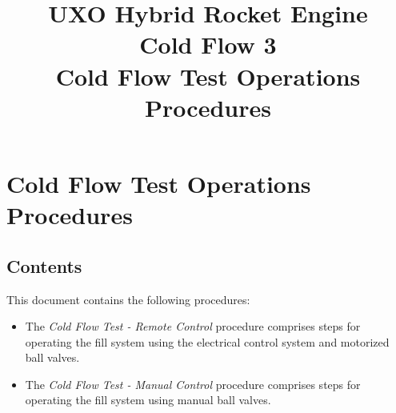 

\title{
\Huge UXO Hybrid Rocket Engine\\
Cold Flow 3\\
\vspace{1cm}
\Large Cold Flow Test Operations Procedures}





\section{Cold Flow Test Operations Procedures}

\subsection{Contents}
This document contains the following procedures:
\begin{itemize}
    \item The \textit{Cold Flow Test - Remote Control} procedure comprises steps for operating the fill system using the electrical control system and motorized ball valves.
    \item The \textit{Cold Flow Test - Manual Control} procedure comprises steps for operating the fill system using manual ball valves.
\end{itemize}

